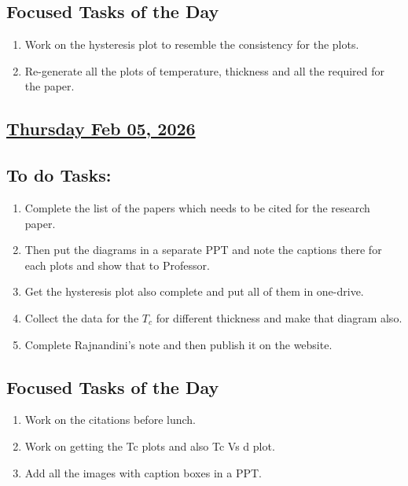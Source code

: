 \subsection*{Focused Tasks of the Day}
\begin{enumerate}  %
    \item Work on the hysteresis plot to resemble the consistency for the plots.
    \item Re-generate all the plots of temperature, thickness and all the required for the paper. 
\end{enumerate}
\subsection*{\underline{Thursday Feb 05, 2026}}
\subsection*{To do Tasks:}
\begin{enumerate}
    \item Complete the list of the papers which needs to be cited for the research paper.
    \item Then put the diagrams in a separate PPT and note the captions there for each plots and show that to Professor.
    \item Get the hysteresis plot also complete and put all of them in one-drive.
    \item Collect the data for the $T_c$ for different thickness and make that diagram also.
    \item Complete Rajnandini's note and then publish it on the website. \cmark
\end{enumerate}
\subsection*{Focused Tasks of the Day}
\begin{enumerate}  %
    \item Work on the citations before lunch. \cmark
    \item Work on getting the Tc plots and also Tc Vs d plot. \xmark
    \item Add all the images with caption boxes in a PPT. \xmark
\end{enumerate}
